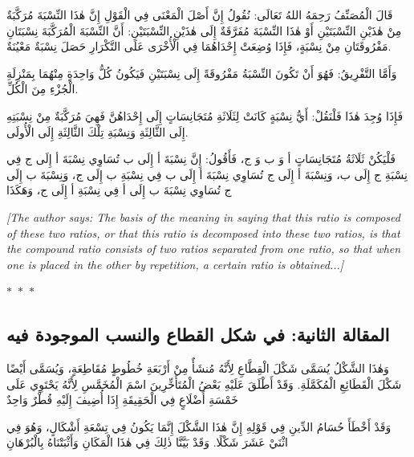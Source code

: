 \documentclass[11pt,a4paper]{article}
\theoremstyle{plain}
\theoremstyle{definition}
\theoremstyle{remark}
\newcommand{\ar}[1]{{\arabicfont\beginR #1\endR}}
\newcommand{\ornament}{\begin{center}\textcolor{goldaccent}{$\ast$~$\ast$~$\ast$}\end{center}}
\begin{document}
\ar{قَالَ الْمُصَنِّفُ رَحِمَهُ اللهُ تَعَالَى: نُقُولُ إِنَّ أَصْلَ الْمَعْنَى فِي الْقَوْلِ إِنَّ هٰذَا النِّسْبَةَ مُرَكَّبَةٌ مِنْ هٰذَيْنِ النِّسْبَتَيْنِ أَوْ هٰذَا النِّسْبَةَ مُفَرَّقَةٌ إِلَى هٰذَيْنِ النِّسْبَتَيْنِ: أَنَّ النِّسْبَةَ الْمُرَكَّبَةَ نِسْبَتَانِ مَفْرُوقَتَانِ مِنْ نِسْبَةٍ، فَإِذَا وُضِعَتْ إِحْدَاهُمَا فِي الْأُخْرَى عَلَى التَّكْرَارِ حَصَلَ نِسْبَةٌ مَعْيُنَةٌ.



وَأَمَّا التَّفْرِيقُ: فَهُوَ أَنْ تَكُونَ النِّسْبَةُ مَفْرُوقَةً إِلَى نِسْبَتَيْنِ فَيَكُونُ كُلُّ وَاحِدَةٍ مِنْهُمَا بِمَنْزِلَةِ الْجُزْءِ مِنَ الْكُلِّ.



فَإِذَا وُجِدَ هٰذَا فَلْنَقُلْ: أَيُّ نِسْبَةٍ كَانَتْ لِثَلَاثَةِ مُتَجَانِسَاتٍ إِلَى إِحْدَاهُنَّ فَهِيَ مُرَكَّبَةٌ مِنْ نِسْبَتِهِ إِلَى الثَّالِثَةِ وَنِسْبَةِ تِلْكَ الثَّالِثَةِ إِلَى الْأُولَى.



فَلْيَكُنْ ثَلَاثَةُ مُتَجَانِسَاتٍ أ وَ ب وَ ج، فَأَقُولُ: إِنَّ نِسْبَةَ أ إِلَى ب تُسَاوِي نِسْبَةَ أ إِلَى ج فِي نِسْبَةِ ج إِلَى ب، وَنِسْبَةَ أ إِلَى ج تُسَاوِي نِسْبَةَ أ إِلَى ب فِي نِسْبَةِ ب إِلَى ج، وَنِسْبَةَ ب إِلَى ج تُسَاوِي نِسْبَةَ ب إِلَى أ فِي نِسْبَةِ أ إِلَى ج، وَهَكَذَا}



\vspace{0.3cm}

\noindent\textcolor{notecolor}{\textit{[The author says: The basis of the meaning in saying that this ratio is composed of these two ratios, or that this ratio is decomposed into these two ratios, is that the compound ratio consists of two ratios separated from one ratio, so that when one is placed in the other by repetition, a certain ratio is obtained...]}}



\ornament



\subsection*{\ar{المقالة الثانية: في شكل القطاع والنسب الموجودة فيه}}




\ar{وَهٰذَا الشَّكْلُ يُسَمَّى شَكْلَ الْقِطَّاعِ لِأَنَّهُ مُنشَأٌ مِنْ أَرْبَعَةِ خُطُوطٍ مُقَاطِعَةٍ، وَيُسَمَّى أَيْضًا شَكْلَ الْقَطَائِعِ الْمُكَمَّلَةِ. وَقَدْ أَطْلَقَ عَلَيْهِ بَعْضُ الْمُتَأَخِّرِينَ اسْمَ الْمُخَمَّسِ لِأَنَّهُ يَحْتَوِي عَلَى خَمْسَةِ أَضْلَاعٍ فِي الْحَقِيقَةِ إِذَا أُضِيفَ إِلَيْهِ قُطْرٌ وَاحِدٌ



وَقَدْ أَخْطَأَ حُسَامُ الدِّينِ فِي قَوْلِهِ إِنَّ هٰذَا الشَّكْلَ إِنَّمَا يَكُونُ فِي تِسْعَةِ أَشْكَالٍ، وَهُوَ فِي اثْنَيْ عَشَرَ شَكْلًا. وَقَدْ بَيَّنَّا ذٰلِكَ فِي هٰذَا الْمَكَانِ وَأَثْبَتْنَاهُ بِالْبُرْهَانِ}
\end{document}
